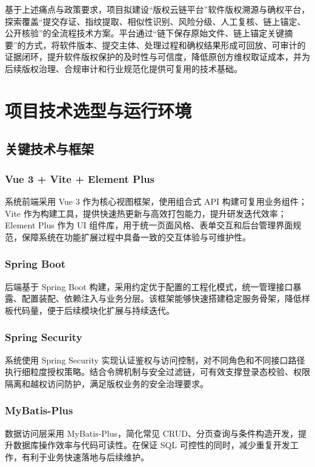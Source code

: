 \documentclass[UTF8,a4paper,12pt]{ctexart}
\begin{document}
基于上述痛点与政策要求，项目拟建设“版权云链平台”软件版权溯源与确权平台，探索覆盖“提交存证、指纹提取、相似性识别、风险分级、人工复核、链上锚定、公开核验”的全流程技术方案。平台通过“链下保存原始文件、链上锚定关键摘要”的方式，将软件版本、提交主体、处理过程和确权结果形成可回放、可审计的证据闭环，提升软件版权保护的及时性与可信度，降低原创方维权取证成本，并为后续版权治理、合规审计和行业规范化提供可复用的技术基础。


\section{项目技术选型与运行环境}
\subsection{关键技术与框架}

\subsubsection{Vue 3 + Vite + Element Plus}
系统前端采用 Vue 3 作为核心视图框架，使用组合式 API 构建可复用业务组件；Vite 作为构建工具，提供快速热更新与高效打包能力，提升研发迭代效率；Element Plus 作为 UI 组件库，用于统一页面风格、表单交互和后台管理界面规范，保障系统在功能扩展过程中具备一致的交互体验与可维护性。

\subsubsection{Spring Boot}
后端基于 Spring Boot 构建，采用约定优于配置的工程化模式，统一管理接口暴露、配置装配、依赖注入与业务分层。该框架能够快速搭建稳定服务骨架，降低样板代码量，便于后续模块化扩展与持续迭代。

\subsubsection{Spring Security}
系统使用 Spring Security 实现认证鉴权与访问控制，对不同角色和不同接口路径执行细粒度授权策略。结合令牌机制与安全过滤链，可有效支撑登录态校验、权限隔离和越权访问防护，满足版权业务的安全治理要求。

\subsubsection{MyBatis-Plus}
数据访问层采用 MyBatis-Plus，简化常见 CRUD、分页查询与条件构造开发，提升数据库操作效率与代码可读性。在保证 SQL 可控性的同时，减少重复开发工作，有利于业务快速落地与后续维护。
\end{document}
